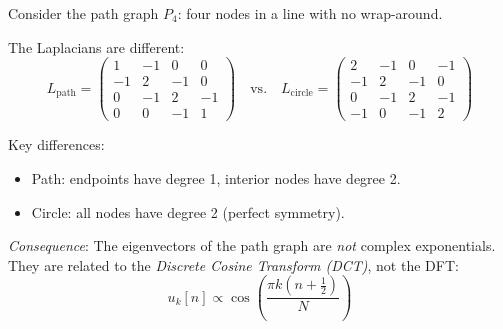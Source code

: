 \begin{notechapter}
\begin{example}
Consider the path graph $P_4$: four nodes in a line with no wrap-around.

\begin{center}
\end{center}

The Laplacians are different:
\[
L_{\text{path}} = \begin{pmatrix}
1 & -1 & 0 & 0 \\
-1 & 2 & -1 & 0 \\
0 & -1 & 2 & -1 \\
0 & 0 & -1 & 1
\end{pmatrix}
\quad \text{vs.} \quad
L_{\text{circle}} = \begin{pmatrix}
2 & -1 & 0 & -1 \\
-1 & 2 & -1 & 0 \\
0 & -1 & 2 & -1 \\
-1 & 0 & -1 & 2
\end{pmatrix}
\]

Key differences:
\begin{itemize}
    \item Path: endpoints have degree 1, interior nodes have degree 2.
    \item Circle: all nodes have degree 2 (perfect symmetry).
\end{itemize}

\emph{Consequence}: The eigenvectors of the path graph are
\emph{not} complex exponentials. They are related to the
\emph{Discrete Cosine Transform (DCT)}, not the DFT:
\[
u_k[n] \propto \cos\left(\frac{\pi k (n + \frac{1}{2})}{N}\right)
\]


\end{example}
\end{notechapter}
